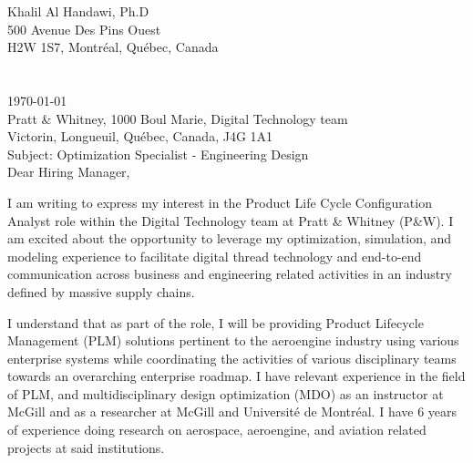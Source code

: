 \documentclass[12pt]{article} %
\begin{document}

Khalil Al Handawi, Ph.D\\
500 Avenue Des Pins Ouest\\
H2W 1S7, Montr\'{e}al, Qu\'{e}bec, Canada\\
\faPhone~~\cvnumberphone\\
\faEnvelope~~\href{mailto:\cvmail}{\cvmail}\\

\today\\

Pratt \& Whitney, 1000 Boul Marie, Digital Technology team\\
Victorin, Longueuil, Qu\'{e}bec, Canada, J4G 1A1\\
Subject: Optimization Specialist - Engineering Design\\[6pt]


Dear Hiring Manager,

\medskip %

I am writing to express my interest in the Product Life Cycle Configuration Analyst role within the Digital Technology team at Pratt \& Whitney (P\&W). I am excited about the opportunity to leverage my optimization, simulation, and modeling experience to facilitate digital thread technology and end-to-end communication across business and engineering related activities in an industry defined by massive supply chains.

\medskip %

I understand that as part of the role, I will be providing Product Lifecycle Management (PLM) solutions pertinent to the aeroengine industry using various enterprise systems while coordinating the activities of various disciplinary teams towards an overarching enterprise roadmap. I have relevant experience in the field of PLM, and multidisciplinary design optimization (MDO) as an instructor at McGill and as a researcher at McGill and Universit\'{e} de Montr\'{e}al. I have 6 years of experience doing research on aerospace, aeroengine, and aviation related projects at said institutions.
\end{document}
